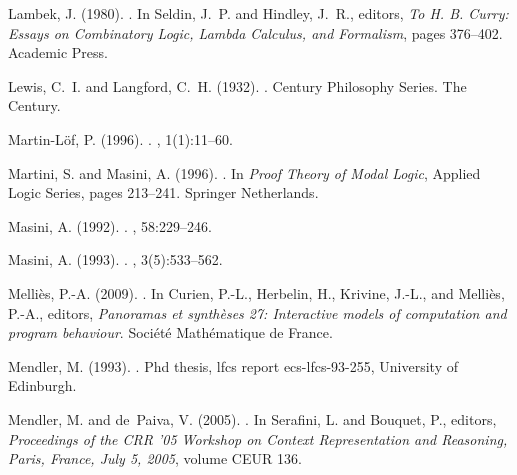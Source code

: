 \documentclass[a4paper]{amsart}
\begin{document}
\begin{thebibliography}{}
Lambek, J. (1980).
.
\newblock In Seldin, J.~P. and Hindley, J.~R., editors, {\em To H. B. Curry:
  Essays on Combinatory Logic, Lambda Calculus, and Formalism}, pages 376--402.
  Academic Press.

Lewis, C.~I. and Langford, C.~H. (1932).
.
\newblock Century Philosophy Series. The Century.

Martin-L{\"{o}}f, P. (1996).
.
, 1(1):11--60.

Martini, S. and Masini, A. (1996).
.
\newblock In {\em Proof Theory of Modal Logic}, Applied Logic Series, pages
  213--241. Springer Netherlands.

Masini, A. (1992).
.
, 58:229--246.

Masini, A. (1993).
.
, 3(5):533--562.

Melli{\`{e}}s, P.-A. (2009).
.
\newblock In Curien, P.-L., Herbelin, H., Krivine, J.-L., and Melli{\`{e}}s,
  P.-A., editors, {\em Panoramas et synth{\`{e}}ses 27: Interactive models of
  computation and program behaviour}. Soci{\'{e}}t{\'{e}} Math{\'{e}}matique de
  France.

Mendler, M. (1993).
.
\newblock Phd thesis, lfcs report ecs-lfcs-93-255, University of Edinburgh.

Mendler, M. and de~Paiva, V. (2005).
.
\newblock In Serafini, L. and Bouquet, P., editors, {\em Proceedings of the CRR
  '05 Workshop on Context Representation and Reasoning, Paris, France, July 5,
  2005}, volume CEUR 136.


\end{thebibliography}
\end{document}
